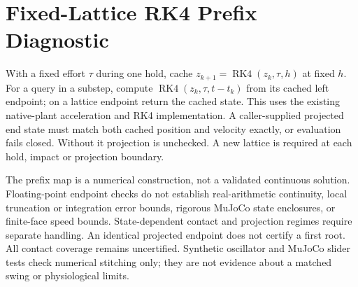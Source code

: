 \documentclass{article}
\begin{document}
\section{Fixed-Lattice RK4 Prefix Diagnostic}
With a fixed effort $\tau$ during one hold, cache
$z_{k+1}=\operatorname{RK4}(z_k,\tau,h)$ at fixed $h$. For a query in a
substep, compute $\operatorname{RK4}(z_k,\tau,t-t_k)$ from its cached left
endpoint; on a lattice endpoint return the cached state. This uses the existing
native-plant acceleration and RK4 implementation. A caller-supplied projected
end state must match both cached position and velocity exactly, or evaluation
fails closed. Without it projection is unchecked. A new lattice is required
at each hold, impact or projection boundary.

The prefix map is a numerical construction, not a validated continuous
solution. Floating-point endpoint checks do not establish real-arithmetic
continuity, local truncation or integration error bounds, rigorous MuJoCo
state enclosures, or finite-face speed bounds. State-dependent contact and
projection regimes require separate handling. An identical projected endpoint
does not certify a first root. All contact coverage remains uncertified.
Synthetic oscillator and MuJoCo slider tests check numerical stitching only;
they are not evidence about a matched swing or physiological limits.
\end{document}
